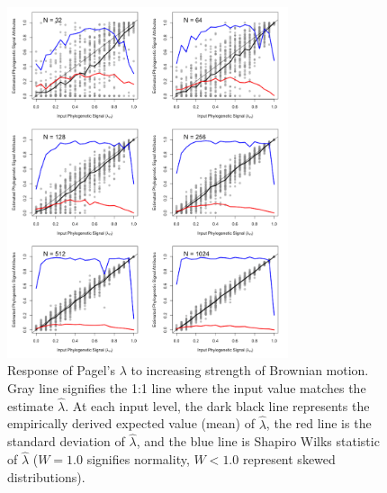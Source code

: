 \documentclass[9pt,twocolumn,twoside,lineno]{pnas-new}
\begin{document}
\begin{figure}
\centering
\includegraphics[width=8.25cm]{fig.1.png}
\caption{Response of Pagel's \(\lambda\) to increasing strength of
Brownian motion. Gray line signifies the 1:1 line where the input value
matches the estimate \(\hat\lambda\). At each input level, the dark
black line represents the empirically derived expected value (mean) of
\(\hat\lambda\), the red line is the standard deviation of
\(\hat\lambda\), and the blue line is Shapiro Wilks statistic of
\(\hat\lambda\) (\(W=1.0\) signifies normality, \(W< 1.0\) represent
skewed distributions).{}}
\end{figure}
\end{document}
